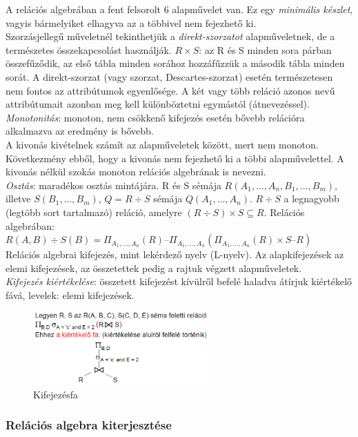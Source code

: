\documentclass[margin=0px]{article}
\begin{document}
	A relációs algebrában a fent felsorolt 6 alapművelet van. Ez egy \textit{minimális készlet}, vagyis bármelyiket elhagyva az a többivel nem fejezhető ki. \\
	Szorzásjellegű műveletnél tekinthetjük a \textit{direkt-szorzatot} alapműveletnek, de a természetes összekapcsolást használják. $R \times S$: az R és S minden sora párban összefűződik, az első tábla minden sorához hozzáfűzzük a második tábla minden sorát. A direkt-szorzat (vagy szorzat, Descartes-szorzat) esetén természetesen nem fontos az attribútumok egyenlősége. A két vagy több reláció azonos nevű attribútumait azonban meg kell különböztetni egymástól (átnevezéssel). \\
	\textit{Monotonitás}: monoton, nem csökkenő kifejezés esetén bővebb relációra alkalmazva az eredmény is bővebb.\\
	A kivonás kivételnek számít az alapműveletek között, mert nem monoton. Következmény ebből, hogy a kivonás nem fejezhető ki a többi alapművelettel. A kivonás nélkül szokás monoton relációs algebrának is nevezni. \\
	\textit{Osztás}: maradékos osztás mintájára. R és S sémája $R(A_1,...,A_n,B_1,...,B_m)$, illetve $S(B_1,...,B_m)$, $Q = R \div S$ sémája $Q(A_1,...,A_n)$. $R \div S$ a legnagyobb (legtöbb sort tartalmazó) reláció, amelyre $( R \div S ) \times S \subseteq R.$ Relációs algebrában: $R(A,B) \div S(B) = \Pi_{A_1,...,A_n}(R) – \Pi_{A_1,...,A_n}( \Pi_{A_1,...,A_n}(R) \times S – R )$\\
	Relációs algebrai kifejezés, mint lekérdező nyelv (L-nyelv). Az alapkifejezések az elemi kifejezések, az összetettek pedig a rajtuk végzett alapműveletek. \\
	\textit{Kifejezés kiértékelése}: összetett kifejezést kívülről befelé haladva átírjuk kiértékelő fává, levelek: elemi kifejezések.
	\begin{figure}[H]
		\centering
		\includegraphics[width=0.6\textwidth]{img/relalg1.png}
		\caption{Kifejezésfa}
	\end{figure}
	
	\subsubsection{Relációs algebra kiterjesztése}
	
\end{document}
